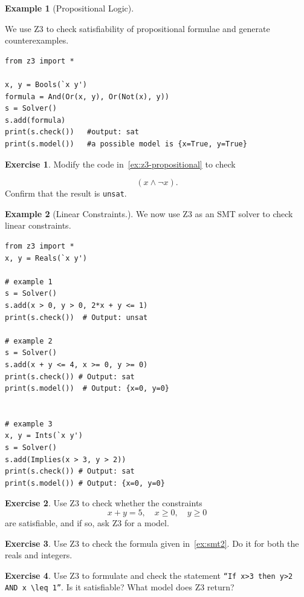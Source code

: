 \documentclass[oneside,11pt,dvipsnames]{book}
\numberwithin{equation}{section}
\theoremstyle{definition}
\newtheorem{example}{Example}[section]
\newtheorem{exercise}{Exercise}[section]
\theoremstyle{remark}
\begin{document}
\begin{example}[Propositional Logic]\label{ex:z3-propositional}

We use Z3 to check satisfiability of propositional formulae and generate counterexamples.

\begin{lstlisting}
from z3 import *

x, y = Bools(`x y')
formula = And(Or(x, y), Or(Not(x), y))
s = Solver()
s.add(formula)
print(s.check())   #output: sat
print(s.model())   #a possible model is {x=True, y=True}
\end{lstlisting}
\end{example}

\begin{exercise}
Modify the code in~\autoref{ex:z3-propositional} to check 

\[
(x \land \lnot x).
\]
Confirm that the result is \texttt{unsat}.
\end{exercise}




\begin{example}[Linear Constraints.]

We now use Z3 as an SMT solver to check linear constraints.

    \begin{lstlisting}
from z3 import *
x, y = Reals(`x y')

# example 1
s = Solver()
s.add(x > 0, y > 0, 2*x + y <= 1)
print(s.check())  # Output: unsat

# example 2
s = Solver()
s.add(x + y <= 4, x >= 0, y >= 0)
print(s.check()) # Output: sat
print(s.model())  # Output: {x=0, y=0}


# example 3
x, y = Ints(`x y')
s = Solver()
s.add(Implies(x > 3, y > 2))
print(s.check()) # Output: sat
print(s.model()) # Output: {x=0, y=0}
\end{lstlisting}
\end{example}

\begin{exercise}
Use Z3 to check whether the constraints
\[
x+y=5, \quad x \geq 0, \quad y \geq 0
\]
are satisfiable, and if so, ask Z3 for a model.
\end{exercise}

\begin{exercise}
Use Z3 to check the formula given in~\autoref{ex:smt2}. Do it for both the reals and integers.
\end{exercise}

\begin{exercise}
Use Z3 to formulate and check the statement \texttt{``If $x>3$ then $y>2$ AND $x \leq 1$''}.
Is it satisfiable? What model does Z3 return?
\end{exercise}
\end{document}
